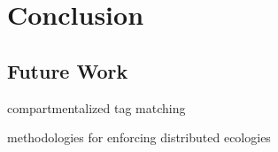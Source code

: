 \chapter{Conclusion}
\label{ch:conclusion}

\section{Future Work}

compartmentalized tag matching

methodologies for enforcing distributed ecologies
